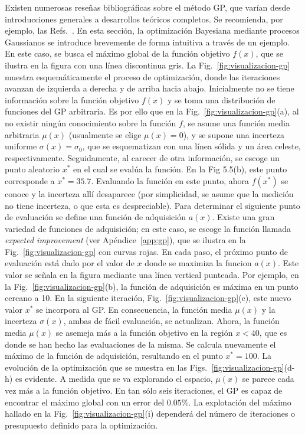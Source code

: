 Existen numerosas reseñas bibliográficas sobre el método GP, que varían 
desde introducciones generales a desarrollos teóricos completos. Se 
recomienda, por ejemplo, las Refs.~\cite{Rasmussen:06,Murphy:12}. En 
esta sección, la optimización Bayesiana mediante procesos Gaussianos se 
introduce brevemente de forma intuitiva a través de un ejemplo. En este 
caso, se busca el máximo global de la función objetivo $f(x)$, que se 
ilustra en la figura con una línea discontinua gris. La 
Fig.~\ref{fig:visualizacion-gp} muestra esquemáticamente el proceso de 
optimización, donde las iteraciones avanzan de izquierda a derecha y de 
arriba hacia abajo. Inicialmente no se tiene información sobre la 
función objetivo $f(x)$ y se toma una distribución de funciones del GP 
arbitraria. Es por ello que en la Fig.~\ref{fig:visualizacion-gp}(a), al 
no existir ningún conocimiento sobre la función $f$, se asume una 
función media arbitraria $\mu(x)$ (usualmente se elige $\mu(x)=0$), y se 
supone una incerteza uniforme $\sigma(x)=\sigma_0$, que se esquematizan 
con una línea sólida y un área celeste, respectivamente. Seguidamente, 
al carecer de otra información, se escoge un punto aleatorio $x^*$ en el 
cual se evalúa la función. En la Fig 5.5(b), este punto corresponde a 
$x^*=35.7$. Evaluando la función en este punto, ahora $f(x^*)$ se conoce 
y la incerteza allí desaparece (por simplicidad, se asume que la 
medición no tiene incerteza, o que esta es despreciable). Para 
determinar el siguiente punto de evaluación se define una función de 
adquisición $a(x)$. Existe una gran variedad de funciones de 
adquisición; en este caso, se escoge la función llamada 
\textit{expected improvement} (ver Apéndice~\ref{app:gp}), que se 
ilustra en la Fig.~\ref{fig:visualizacion-gp} con curvas rojas. En cada 
paso, el próximo punto de evaluación está dado por el valor de $x$ donde 
se maximiza la funcion $a(x)$. Este valor se señala en la figura 
mediante una línea vertical punteada. Por ejemplo, en la 
Fig.~\ref{fig:visualizacion-gp}(b), la función de adquisición es máxima 
en un punto cercano a 10. En la siguiente iteración, 
Fig.~\ref{fig:visualizacion-gp}(c), este nuevo valor $x^*$ se incorpora 
al GP. En consecuencia, la función media $\mu(x)$ y la incerteza 
$\sigma(x)$, ambas de fácil evaluación, se actualizan. Ahora, la función 
media $\mu(x)$ se asemeja más a la función objetivo en la región $x<40$, 
que es donde se han hecho las evaluaciones de la misma. Se calcula 
nuevamente el máximo de la función de adquisición, resultando en el 
punto $x^*=100$. La evolución de la optimización que se muestra en las 
Figs.~\ref{fig:visualizacion-gp}(d-h) es evidente. A medida que se va 
explorando el espacio, $\mu(x)$ se parece cada vez más a la función 
objetivo. En tan sólo seis iteraciones, el GP es capaz de encontrar el 
máximo global con un error del $0.05\%$. La explotación del máximo 
hallado en la Fig.~\ref{fig:visualizacion-gp}(i) dependerá del número 
de iteraciones o presupuesto definido para la optimización. 

